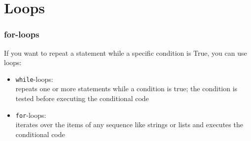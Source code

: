 \documentclass{beamer}
\begin{document}
\section{Loops}

\begin{frame}
\frametitle{for-loops}
	If you want to repeat a statement while a specific condition is True, you can use loops:
	\begin{itemize}
		\item \texttt{while}-loops: \\ repeats one or more statements while a condition is true; the condition is tested before executing the conditional code
		\item \texttt{for}-loops: \\ iterates over the items of any sequence like strings or lists and executes the conditional code
	\end{itemize}
\end{frame}
\end{document}

